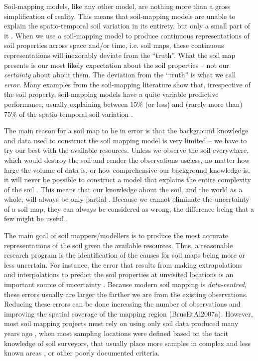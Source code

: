 Soil-mapping models, like any other model, are nothing more than a gross simplification of reality.
This means that soil-mapping models are unable to explain the spatio-temporal soil variation in 
its entirety, but only a small part of it \citep{Heuvelink1998a}. When we use a soil-mapping model
to produce continuous representations of soil properties across space and/or time, i.e. soil
maps, these continuous representations will inexorably deviate from the ``truth''. What the soil map
presents is our most likely expectation about the soil properties -- not our \textit{certainty} about
about them. The deviation from the ``truth'' is what we call \textit{error}. Many examples from the 
soil-mapping literature show that, irrespective of the soil property, soil-mapping models have a 
quite variable predictive performance, usually explaining between 15\% (or less) and (rarely more 
than) 75\% of the spatio-temporal soil variation \citep{MooreEtAl1993, OdehEtAl1994, GesslerEtAl1995, 
McKenzieEtAl1999, GobinEtAl2001, SumflethEtAl2008, SunEtAl2012, ViscarraRosselEtAl2013, 
NussbaumEtAl2014, HenglEtAl2015, GaschEtAl2015, HeungEtAl2016}.

The main reason for a soil map to be in error is that the background knowledge and data used to 
construct the soil mapping model is very limited -- we have to try our best with the available 
resources. Unless we observe the soil everywhere, which would destroy the soil and render the 
observations useless, no matter how large the volume of data is, or how comprehensive our background
knowledge is, it will never be possible to construct a model that explains the entire complexity of 
the soil \citep{Tukey1997}. This means that our knowledge about the soil, and the world as a whole, 
will always be only partial \citep{Box1993}. Because we cannot eliminate the uncertainty of a soil 
map, they can always be considered as wrong, the difference being that a few might be useful 
\citep{Box1976}.

The main goal of soil mappers/modellers is to produce the most accurate representations of the soil 
given the available resources. Thus, a reasonable research program is the identification of the 
causes for soil maps being more or less uncertain. For instance, the error that results from making 
extrapolations and interpolations to predict the soil properties at unvisited locations is an 
important source of uncertainty \citep{HeuvelinkEtAl1999, RefsgaardEtAl2006}. Because modern soil 
mapping is \textit{data-centred}, these errors usually are larger the farther we are from the 
existing observations. Reducing these errors can be done increasing the number of observations and 
improving the spatial coverage of the mapping region (BrusEtAl2007a). However, most soil mapping 
projects must rely on using only soil data produced many years ago \citep{KempenEtAl2009, 
HenglEtAl2014, PoggioEtAl2014, NussbaumEtAl2014, MulderEtAl2016}, when most sampling locations were 
defined based on the tacit knowledge of soil surveyors, that usually place more samples in complex 
and less known areas \citep{Rossiter2000}, or other poorly documented criteria.

